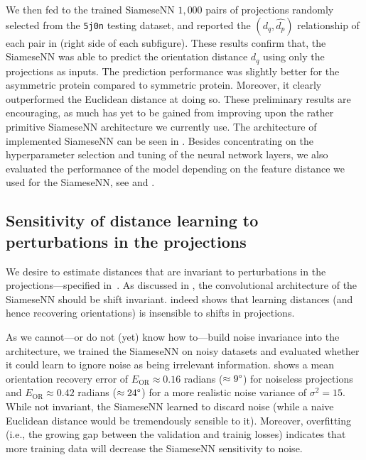 We then fed to the trained SiameseNN $1,000$ pairs of projections randomly selected from the \texttt{5j0n} testing dataset, and reported the $(d_q,\widehat{d_p})$ relationship of each pair in  (right side of each subfigure).
These results confirm that, the SiameseNN was able to predict the orientation distance $d_q$ using only the projections as inputs.
The prediction performance was slightly better for the asymmetric protein compared to symmetric protein.
Moreover, it clearly outperformed the Euclidean distance at doing so.
These preliminary results are encouraging, as much has yet to be gained from improving upon the rather primitive SiameseNN architecture we currently use.
The architecture of implemented SiameseNN can be seen in .
Besides concentrating on the hyperparameter selection and tuning of the neural network layers, we also evaluated the performance of the model depending on the feature distance we used for the SiameseNN, see  and .


\subsection{Sensitivity of distance learning to perturbations in the projections}\label{sec:results:distance-estimation:sensitivity}


We desire to estimate distances that are invariant to perturbations in the projections---specified in~.
As discussed in , the convolutional architecture of the SiameseNN should be shift invariant.
 indeed shows that learning distances (and hence recovering orientations) is insensible to shifts in projections.

As we cannot---or do not (yet) know how to---build noise invariance into the architecture, we trained the SiameseNN on noisy datasets and evaluated whether it could learn to ignore noise as being irrelevant information.
 shows a mean orientation recovery error of $E_\text{OR} \approx 0.16$ radians ($\approx 9\degree$) for noiseless projections and $E_\text{OR} \approx 0.42$ radians ($\approx 24\degree$) for a more realistic noise variance of $\sigma^2=15$.
While not invariant, the SiameseNN learned to discard noise (while a naive Euclidean distance would be tremendously sensible to it).
Moreover, overfitting (i.e., the growing gap between the validation and trainig losses) indicates that more training data will decrease the SiameseNN sensitivity to noise.

